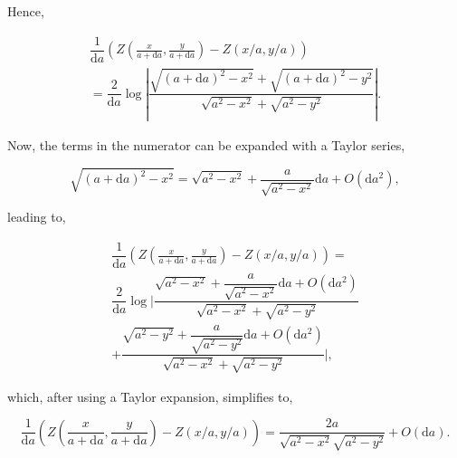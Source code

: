 \noindent Hence,

\begin{multline}
    \dfrac{1}{\text{d}a}\left(  Z(\frac{x}{a+\text{d}a}, \frac{y}{a+\text{d}a}) - Z(x/a, y/a) \right) \\
    = \dfrac{2}{\text{d}a}\log\left|\dfrac{\sqrt{(a+\text{d}a)^2-x^2}+\sqrt{(a+\text{d}a)^2-y^2}}{\sqrt{a^2-x^2}+\sqrt{a^2-y^2}}\right|. 
\end{multline}

\noindent Now, the terms in the numerator can be expanded with a Taylor series,

\begin{equation}
    \sqrt{(a+\text{d}a)^2-x^2} = \sqrt{a^2-x^2} + \dfrac{a}{\sqrt{a^2-x^2}}\text{d}a + O(\text{d}a^2),
\end{equation}

\noindent leading to, 

\begin{multline}
    \dfrac{1}{\text{d}a}\left(  Z(\frac{x}{a+\text{d}a}, \frac{y}{a+\text{d}a}) - Z(x/a, y/a) \right) = \\
    \dfrac{2}{\text{d}a}\log\Biggl|\dfrac{\sqrt{a^2-x^2} + \dfrac{a}{\sqrt{a^2-x^2}}\text{d}a + O(\text{d}a^2)}{\sqrt{a^2-x^2}+\sqrt{a^2-y^2}} \\ + \dfrac{\sqrt{a^2-y^2} + \dfrac{a}{\sqrt{a^2-y^2}}\text{d}a + O(\text{d}a^2)}{\sqrt{a^2-x^2}+\sqrt{a^2-y^2}}\Biggr|,
\end{multline}

\noindent which, after using a Taylor expansion, simplifies to, 

\begin{equation}
    \dfrac{1}{\text{d}a}\left(  Z(\frac{x}{a+\text{d}a}, \frac{y}{a+\text{d}a}) - Z(x/a, y/a) \right) =  \dfrac{2a}{\sqrt{a^2-x^2}\sqrt{a^2-y^2}} + O(\text{d}a).
\end{equation}


     
